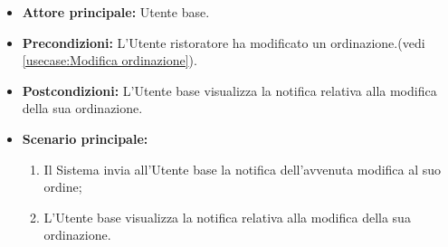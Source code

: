 \label{usecase:Visualizzazione notifica modifica ordinazione}
\begin{itemize}
	\item \textbf{Attore principale:} Utente base.

	\item \textbf{Precondizioni:} L'Utente ristoratore ha modificato un ordinazione.(vedi \autoref{usecase:Modifica ordinazione}).

	\item \textbf{Postcondizioni:} L'Utente base visualizza la notifica relativa alla modifica della sua ordinazione.

	\item \textbf{Scenario principale:}
	      \begin{enumerate}
		      \item Il Sistema invia all'Utente base la notifica dell'avvenuta modifica al suo ordine;

		      \item L'Utente base visualizza la notifica relativa alla modifica della sua ordinazione.
	      \end{enumerate}
\end{itemize}
